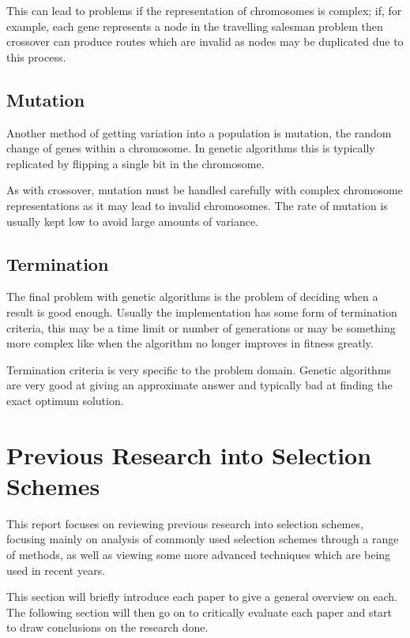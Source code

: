 \documentclass[10pt, a4paper]{article}
\begin{document}
This can lead to problems if the representation of chromosomes is complex; if,
for example, each gene represents a node in the travelling salesman problem
then crossover can produce routes which are invalid as nodes may be duplicated
due to this process.

\subsection{Mutation}

Another method of getting variation into a population is mutation, the random
change of genes within a chromosome. In genetic algorithms this is typically
replicated by flipping a single bit in the chromosome.

As with crossover, mutation must be handled carefully with complex chromosome
representations as it may lead to invalid chromosomes. The rate of mutation 
is usually kept low to avoid large amounts of variance.


\subsection{Termination}

The final problem with genetic algorithms is the problem of deciding when a 
result is good enough. Usually the implementation has some form of termination
criteria, this may be a time limit or number of generations or may be something
more complex like when the algorithm no longer improves in fitness greatly.

Termination criteria is very specific to the problem domain. Genetic algorithms
are very good at giving an approximate answer and typically bad at finding the
exact optimum solution.

\FloatBarrier

\newpage
\section{Previous Research into Selection Schemes}
\label{sec:selection-algorithms}

This report focuses on reviewing previous research into selection schemes,
focusing mainly on analysis of commonly used selection schemes through a range
of methods, as well as viewing some more advanced techniques which are being
used in recent years.

This section will briefly introduce each paper to give a general overview on
each. The following section will then go on to critically evaluate each paper
and start to draw conclusions on the research done.
\end{document}
